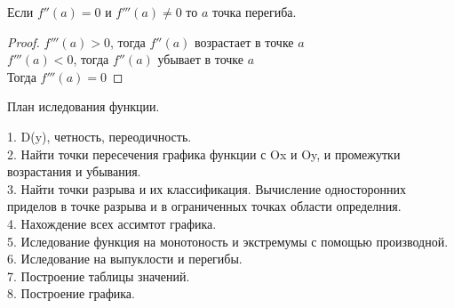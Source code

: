 \begin{theorem}
  Если $f''(a) = 0$ и $f'''(a) \not= 0$ то $a$ точка перегиба.
\end{theorem}

\begin{proof}
  $f'''(a) > 0$, тогда $f''(a)$ возрастает в точке $a$\\
  $f'''(a) < 0$, тогда $f''(a)$ убывает в точке $a$\\
Тогда $f'''(a) = 0$
\end{proof}

\begin{title}[\Large]
  План иследования функции.
\end{title}
1. D(y), четность, переодичность.\\
2. Найти точки пересечения графика функции с Ox и Oy, и промежутки возрастания
  и убывания.\\
3. Найти точки разрыва и их классификация. Вычисление односторонних приделов
  в точке разрыва и в ограниченных точках области определния.\\
4. Нахождение всех ассимтот графика.\\
5. Иследование функция на монотоность и экстремумы с помощью производной.\\
6. Иследование на выпуклости и перегибы.\\
7. Построение таблицы значений.\\
8. Построение графика.\\